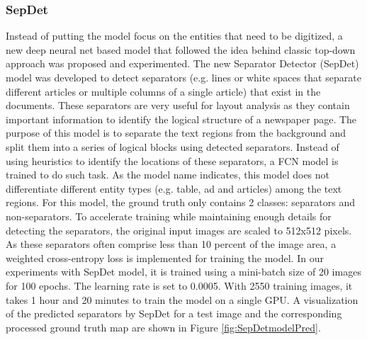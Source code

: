 \documentclass[letterpaper]{article} %
\begin{document}
\subsubsection{SepDet}
Instead of putting the model focus on the entities that need to be digitized, a new deep neural net based model that followed the idea behind classic top-down approach  was proposed and experimented. The new Separator Detector (SepDet) model was developed to detect separators (e.g. lines or white spaces that separate different articles or multiple columns of a single article) that exist in the documents. These separators are very useful for layout analysis as they contain important information to identify the logical structure of a newspaper page. The purpose of this model is to separate the text regions from the background and split them into a series of logical blocks using detected separators. Instead of using heuristics to identify the locations of these separators, a FCN model is trained to do such task.  As the model name indicates, this model does not differentiate different entity types (e.g. table, ad and articles) among the text regions. For this model, the ground truth only contains 2 classes: separators and non-separators.  To accelerate training while maintaining enough details for detecting the separators, the original input images are scaled to 512x512 pixels. As these separators often comprise less than 10 percent of the image area, a weighted cross-entropy loss is implemented for training the model. 
In our experiments with SepDet model, it is trained using a mini-batch size of 20 images for 100 epochs. The learning rate is set to 0.0005. With 2550 training images, it takes 1 hour and 20 minutes to train the model on a single GPU.
A visualization of the predicted separators by SepDet for a test image and the corresponding processed ground truth map are shown in Figure \ref{fig:SepDetmodelPred}.
\end{document}
